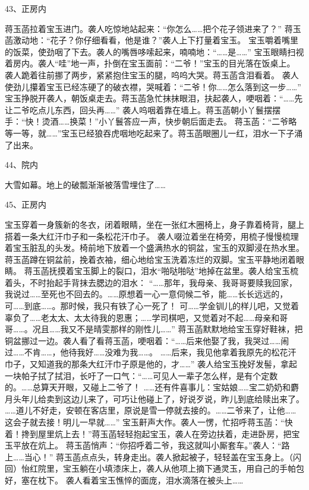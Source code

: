 43、正房内\par
蒋玉菡拉着宝玉进门。袭人吃惊地站起来：“你怎么……把个花子领进来了？”
蒋玉菡激动地：“花子？你仔细看看，他是谁？”袭人上下打量着宝玉。
宝玉嚼着嘴里的饭菜，使劲咽了下去。袭人的嘴唇哆嗦起来，喃喃地：“……是……”
宝玉眼睛扫视着房内。袭人“哇”地一声，扑倒在宝玉面前：“二爷！”宝玉的目光落在饭桌上。
袭人跪着往前挪了两步，紧紧抱住宝玉的腿，呜呜大哭。蒋玉菡含泪看着。
袭人使劲儿攥着宝玉已经冻硬了的破衣襟，哭喊着：“二爷！你……怎么落到这一步……”
宝玉挣脱开袭人，朝饭桌走去。蒋玉菡急忙抹抹眼泪，扶起袭人，哽咽着：“……先让二爷吃点儿东西，回头再……”
袭人呜咽着靠在墙上。蒋玉菡朝小丫鬟摆摆手：“快！烫酒……换菜！”小丫鬟答应一声，快步朝后面走去。
蒋玉菡：“二爷略等一等，就……”宝玉已经狼吞虎咽地吃起来了。蒋玉菡眼圈儿一红，泪水一下子涌了出来。

44、院内\par
大雪如幕。地上的破瓢渐渐被落雪埋住了……

45、正房内\par
宝玉穿着一身簇新的冬衣，闭着眼睛，坐在一张红木圈椅上，身子靠着椅背，腿上搭着一条大红汗巾子和一条松花汗巾子。
袭人啜泣着坐在椅旁，用梳子慢慢梳理着宝玉脏乱的头发。椅前地下放着一个盛满热水的铜盆，宝玉的双脚浸在热水里。
蒋玉菡蹲在铜盆前，挽着衣袖，细心地给宝玉洗着冻烂的双脚。宝玉平静地闭着眼睛。
蒋玉菡抚摸着宝玉脚上的裂口，泪水“啪哒啪哒”地掉在盆里。袭人给宝玉梳着头，不时抬起手背抹去腮边的泪水：
“……那年，我母亲、我哥哥要赎我回家，我说过……至死也不回去的。……原想着一心一意伺候二爷，能……长长远远的，可……到底……。那时候，我只有铁了心一死了！
可……学金钏儿的样儿吧，又觉着辜负了……老太太、太太待我的恩惠；……学司棋吧，又觉着对不起……母亲和哥哥……。况且……我又不是晴雯那样的刚性儿……”
蒋玉菡默默地给宝玉穿好鞋袜，把铜盆挪过一边。袭人看了看蒋玉菡，哽咽着：“……后来他娶了我，我哭过……闹过……不肯……，他待我好……没难为我……。
……后来，我见他拿着我原先的松花汗巾子，又知道我的那条大红汗巾子原是他的，才……”
袭人给宝玉挽好发髻，拿起一块帕子拭了拭泪，长吁了一口气：“……可见人一辈子怎么样，是有个定数的。……总算天开眼，又碰上二爷了！
……还有件喜事儿：宝姑娘……宝二奶奶和麝月头年儿给卖到这边儿来了，可巧让他碰上了，好说歹说，昨儿到底给赎出来了。
……道儿不好走，安顿在客店里，原说是雪一停就去接的。……二爷来了，让他……这会子就去接！明儿一早就……”
宝玉鼾声大作。袭人一愣，忙招呼蒋玉菡：“快着！搀到屋里炕上去！”蒋玉菡轻轻抱起宝玉，袭人在旁边扶着，走进卧房，把宝玉平放在炕上。
蒋玉菡悄声：“你招呼着二爷，我这就叫小厮套车。”袭人：“路上……当心！”
蒋玉菡点点头，转身走出。袭人掀起被子，轻轻盖在宝玉身上。（闪回）怡红院里，宝玉躺在小填漆床上，袭人从他项上摘下通灵玉，用自己的手帕包好，塞在枕下。
袭人看着宝玉憔悴的面庞，泪水滴落在被头上……

